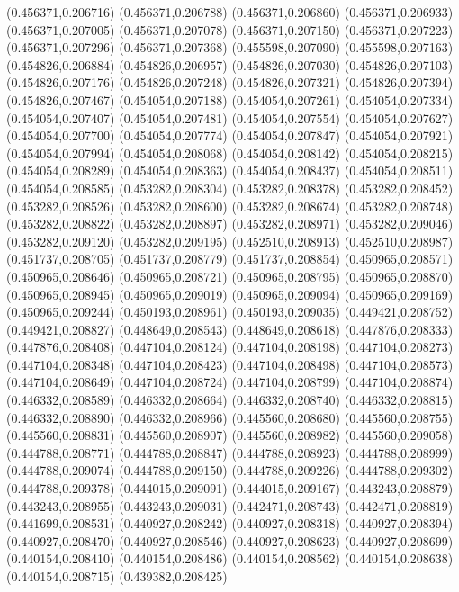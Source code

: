 (0.456371,0.206716)
(0.456371,0.206788)
(0.456371,0.206860)
(0.456371,0.206933)
(0.456371,0.207005)
(0.456371,0.207078)
(0.456371,0.207150)
(0.456371,0.207223)
(0.456371,0.207296)
(0.456371,0.207368)
(0.455598,0.207090)
(0.455598,0.207163)
(0.454826,0.206884)
(0.454826,0.206957)
(0.454826,0.207030)
(0.454826,0.207103)
(0.454826,0.207176)
(0.454826,0.207248)
(0.454826,0.207321)
(0.454826,0.207394)
(0.454826,0.207467)
(0.454054,0.207188)
(0.454054,0.207261)
(0.454054,0.207334)
(0.454054,0.207407)
(0.454054,0.207481)
(0.454054,0.207554)
(0.454054,0.207627)
(0.454054,0.207700)
(0.454054,0.207774)
(0.454054,0.207847)
(0.454054,0.207921)
(0.454054,0.207994)
(0.454054,0.208068)
(0.454054,0.208142)
(0.454054,0.208215)
(0.454054,0.208289)
(0.454054,0.208363)
(0.454054,0.208437)
(0.454054,0.208511)
(0.454054,0.208585)
(0.453282,0.208304)
(0.453282,0.208378)
(0.453282,0.208452)
(0.453282,0.208526)
(0.453282,0.208600)
(0.453282,0.208674)
(0.453282,0.208748)
(0.453282,0.208822)
(0.453282,0.208897)
(0.453282,0.208971)
(0.453282,0.209046)
(0.453282,0.209120)
(0.453282,0.209195)
(0.452510,0.208913)
(0.452510,0.208987)
(0.451737,0.208705)
(0.451737,0.208779)
(0.451737,0.208854)
(0.450965,0.208571)
(0.450965,0.208646)
(0.450965,0.208721)
(0.450965,0.208795)
(0.450965,0.208870)
(0.450965,0.208945)
(0.450965,0.209019)
(0.450965,0.209094)
(0.450965,0.209169)
(0.450965,0.209244)
(0.450193,0.208961)
(0.450193,0.209035)
(0.449421,0.208752)
(0.449421,0.208827)
(0.448649,0.208543)
(0.448649,0.208618)
(0.447876,0.208333)
(0.447876,0.208408)
(0.447104,0.208124)
(0.447104,0.208198)
(0.447104,0.208273)
(0.447104,0.208348)
(0.447104,0.208423)
(0.447104,0.208498)
(0.447104,0.208573)
(0.447104,0.208649)
(0.447104,0.208724)
(0.447104,0.208799)
(0.447104,0.208874)
(0.446332,0.208589)
(0.446332,0.208664)
(0.446332,0.208740)
(0.446332,0.208815)
(0.446332,0.208890)
(0.446332,0.208966)
(0.445560,0.208680)
(0.445560,0.208755)
(0.445560,0.208831)
(0.445560,0.208907)
(0.445560,0.208982)
(0.445560,0.209058)
(0.444788,0.208771)
(0.444788,0.208847)
(0.444788,0.208923)
(0.444788,0.208999)
(0.444788,0.209074)
(0.444788,0.209150)
(0.444788,0.209226)
(0.444788,0.209302)
(0.444788,0.209378)
(0.444015,0.209091)
(0.444015,0.209167)
(0.443243,0.208879)
(0.443243,0.208955)
(0.443243,0.209031)
(0.442471,0.208743)
(0.442471,0.208819)
(0.441699,0.208531)
(0.440927,0.208242)
(0.440927,0.208318)
(0.440927,0.208394)
(0.440927,0.208470)
(0.440927,0.208546)
(0.440927,0.208623)
(0.440927,0.208699)
(0.440154,0.208410)
(0.440154,0.208486)
(0.440154,0.208562)
(0.440154,0.208638)
(0.440154,0.208715)
(0.439382,0.208425)
